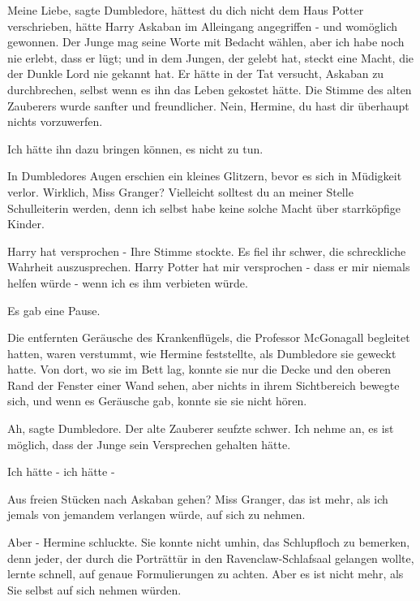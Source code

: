 \glqq{}Meine Liebe\grqq{}, sagte Dumbledore, \glqq{}hättest du dich nicht dem Haus
Potter verschrieben, hätte Harry Askaban im Alleingang angegriffen - und
womöglich gewonnen. Der Junge mag seine Worte mit Bedacht wählen, aber ich habe
noch nie erlebt, dass er lügt; und in dem Jungen, der gelebt hat, steckt eine
Macht, die der Dunkle Lord nie gekannt hat. Er hätte in der Tat versucht,
Askaban zu durchbrechen, selbst wenn es ihn das Leben gekostet hätte.\grqq{} Die
Stimme des alten Zauberers wurde sanfter und freundlicher. \glqq{}Nein, Hermine,
du hast dir überhaupt nichts vorzuwerfen.\grqq{}

\glqq{}Ich hätte ihn dazu bringen können, es nicht zu tun.\grqq{}

In Dumbledores Augen erschien ein kleines Glitzern, bevor es sich in Müdigkeit
verlor. \glqq{}Wirklich, Miss Granger? Vielleicht solltest du an meiner Stelle
Schulleiterin werden, denn ich selbst habe keine solche Macht über starrköpfige
Kinder.\grqq{}

\glqq{}Harry hat versprochen -\grqq{} Ihre Stimme stockte. Es fiel ihr schwer,
die schreckliche Wahrheit auszusprechen. \glqq{}Harry Potter hat mir versprochen
- dass er mir niemals helfen würde - wenn ich es ihm verbieten würde.\grqq{}

Es gab eine Pause.

Die entfernten Geräusche des Krankenflügels, die Professor McGonagall begleitet
hatten, waren verstummt, wie Hermine feststellte, als Dumbledore sie geweckt
hatte. Von dort, wo sie im Bett lag, konnte sie nur die Decke und den oberen
Rand der Fenster einer Wand sehen, aber nichts in ihrem Sichtbereich bewegte
sich, und wenn es Geräusche gab, konnte sie sie nicht hören.

\glqq{}Ah\grqq{}, sagte Dumbledore. Der alte Zauberer seufzte schwer. \glqq{}Ich
nehme an, es ist möglich, dass der Junge sein Versprechen gehalten hätte.\grqq{}

\glqq{}Ich hätte - ich hätte -\grqq{}

\glqq{}Aus freien Stücken nach Askaban gehen? Miss Granger, das ist mehr, als ich
jemals von jemandem verlangen würde, auf sich zu nehmen.\grqq{}

\glqq{}Aber -\grqq{} Hermine schluckte. Sie konnte nicht umhin, das Schlupfloch
zu bemerken, denn jeder, der durch die Porträttür in den Ravenclaw-Schlafsaal
gelangen wollte, lernte schnell, auf genaue Formulierungen zu achten. \glqq{}Aber
es ist nicht mehr, als Sie selbst auf sich nehmen würden.\grqq{}

